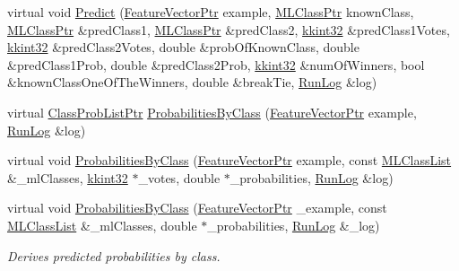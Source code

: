 \begin{DoxyCompactItemize}
virtual void \hyperlink{class_k_k_m_l_l_1_1_model_knn_a83ad87c766cd6927267f7a271d52d74f}{Predict} (\hyperlink{namespace_k_k_m_l_l_a0c5df3d48f45926fbc4fee04f5e3bc04}{Feature\+Vector\+Ptr} example, \hyperlink{namespace_k_k_m_l_l_ac272393853d59e72e8456f14cd6d8c23}{M\+L\+Class\+Ptr} known\+Class, \hyperlink{namespace_k_k_m_l_l_ac272393853d59e72e8456f14cd6d8c23}{M\+L\+Class\+Ptr} \&pred\+Class1, \hyperlink{namespace_k_k_m_l_l_ac272393853d59e72e8456f14cd6d8c23}{M\+L\+Class\+Ptr} \&pred\+Class2, \hyperlink{namespace_k_k_b_a8fa4952cc84fda1de4bec1fbdd8d5b1b}{kkint32} \&pred\+Class1\+Votes, \hyperlink{namespace_k_k_b_a8fa4952cc84fda1de4bec1fbdd8d5b1b}{kkint32} \&pred\+Class2\+Votes, double \&prob\+Of\+Known\+Class, double \&pred\+Class1\+Prob, double \&pred\+Class2\+Prob, \hyperlink{namespace_k_k_b_a8fa4952cc84fda1de4bec1fbdd8d5b1b}{kkint32} \&num\+Of\+Winners, bool \&known\+Class\+One\+Of\+The\+Winners, double \&break\+Tie, \hyperlink{class_k_k_b_1_1_run_log}{Run\+Log} \&log)
\item 
virtual \hyperlink{namespace_k_k_m_l_l_a60f96a524ddb189eff2b4391cf0b651c}{Class\+Prob\+List\+Ptr} \hyperlink{class_k_k_m_l_l_1_1_model_knn_a45c6ac9ae90dec50431f74de47b656ac}{Probabilities\+By\+Class} (\hyperlink{namespace_k_k_m_l_l_a0c5df3d48f45926fbc4fee04f5e3bc04}{Feature\+Vector\+Ptr} example, \hyperlink{class_k_k_b_1_1_run_log}{Run\+Log} \&log)
\item 
virtual void \hyperlink{class_k_k_m_l_l_1_1_model_knn_a9fed09ede10a5ce0540e222e3687a0b0}{Probabilities\+By\+Class} (\hyperlink{namespace_k_k_m_l_l_a0c5df3d48f45926fbc4fee04f5e3bc04}{Feature\+Vector\+Ptr} example, const \hyperlink{class_k_k_m_l_l_1_1_m_l_class_list}{M\+L\+Class\+List} \&\+\_\+ml\+Classes, \hyperlink{namespace_k_k_b_a8fa4952cc84fda1de4bec1fbdd8d5b1b}{kkint32} $\ast$\+\_\+votes, double $\ast$\+\_\+probabilities, \hyperlink{class_k_k_b_1_1_run_log}{Run\+Log} \&log)
\item 
virtual void \hyperlink{class_k_k_m_l_l_1_1_model_knn_a7eb25717610720ec93326ae1898b5ef1}{Probabilities\+By\+Class} (\hyperlink{namespace_k_k_m_l_l_a0c5df3d48f45926fbc4fee04f5e3bc04}{Feature\+Vector\+Ptr} \+\_\+example, const \hyperlink{class_k_k_m_l_l_1_1_m_l_class_list}{M\+L\+Class\+List} \&\+\_\+ml\+Classes, double $\ast$\+\_\+probabilities, \hyperlink{class_k_k_b_1_1_run_log}{Run\+Log} \&\+\_\+log)
\begin{DoxyCompactList}\small\item\em Derives predicted probabilities by class. \end{DoxyCompactList}\item 

\end{DoxyCompactItemize}
